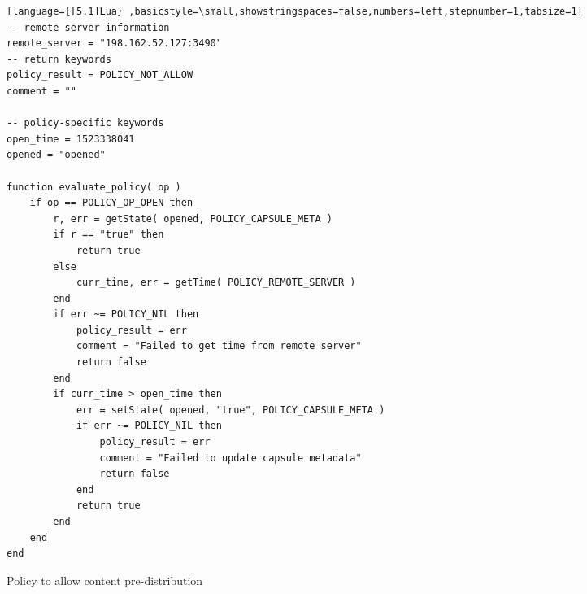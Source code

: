 \begin{figure*}[t]
\begin{lstlisting}[language={[5.1]Lua} ,basicstyle=\small,showstringspaces=false,numbers=left,stepnumber=1,tabsize=1]
-- remote server information
remote_server = "198.162.52.127:3490"
-- return keywords
policy_result = POLICY_NOT_ALLOW
comment = ""

-- policy-specific keywords
open_time = 1523338041
opened = "opened"

function evaluate_policy( op )
    if op == POLICY_OP_OPEN then
        r, err = getState( opened, POLICY_CAPSULE_META )
        if r == "true" then
            return true
        else
            curr_time, err = getTime( POLICY_REMOTE_SERVER )
        end
        if err ~= POLICY_NIL then
            policy_result = err
            comment = "Failed to get time from remote server"
            return false
        end
        if curr_time > open_time then
            err = setState( opened, "true", POLICY_CAPSULE_META )
            if err ~= POLICY_NIL then
                policy_result = err
                comment = "Failed to update capsule metadata"
                return false
            end
            return true
        end
    end
end
\end{lstlisting}
\caption{Policy to allow content pre-distribution}
\label{fig:time_based_access}
\end{figure*}

